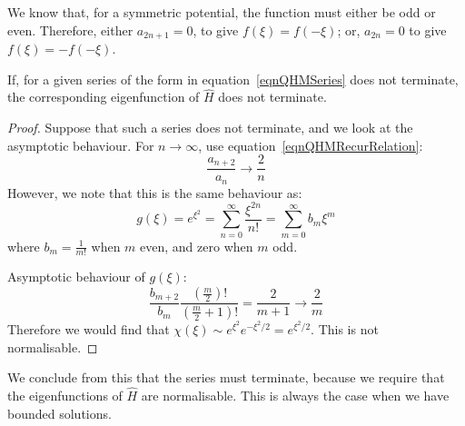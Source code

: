 \documentclass[../Main.tex]{subfiles}
\begin{document}
We know that, for a symmetric potential, the function must either be odd or even. Therefore, either $a_{2n+1} = 0$, to give $f(\xi) = f(-\xi)$; or, $a_{2n} = 0$ to give $f(\xi) = -f(-\xi)$.
\begin{proposition}
    If, for a given series of the form in equation~\ref{eqnQHMSeries} does not terminate, the corresponding eigenfunction of $\hat{H}$ does not terminate.
    \label{propQHMSeriesFinite}
\end{proposition}
\begin{proof}
    Suppose that such a series does not terminate, and we look at the asymptotic behaviour. For $n \to \infty$, use equation~\ref{eqnQHMRecurRelation}:
    \begin{equation*}
        \frac{a_{n+2}}{a_n} \to \frac{2}{n}
    \end{equation*}
    However, we note that this is the same behaviour as:
    \begin{equation*}
        g(\xi) = e^{\xi^2} = \sum_{n=0}^{\infty} \frac{\xi^{2n}}{n!} = \sum_{m=0}^{\infty} b_m \xi^m
    \end{equation*}
    where $b_m = \frac{1}{m!}$ when $m$ even, and zero when $m$ odd.

    Asymptotic behaviour of $g(\xi)$:
    \begin{equation*}
        \frac{b_{m+2}}{b_m} \frac{\left(\frac{m}{2}\right)!}{\left(\frac{m}{2} + 1\right)!} = \frac{2}{m+1}\to \frac{2}{m}
    \end{equation*}
    Therefore we would find that $\chi(\xi) \sim e^{\xi^2} e^{-\xi^2 / 2} = e^{\xi^2 / 2}$. This is not normalisable.
\end{proof}
We conclude from this that the series must terminate, because we require that the eigenfunctions of $\hat{H}$ are normalisable. This is always the case when we have bounded solutions.
\end{document}
